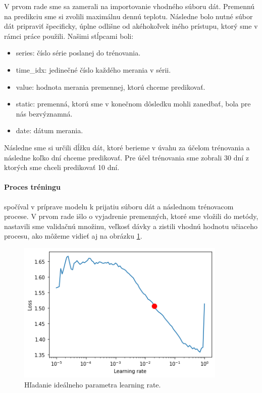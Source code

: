 V prvom rade sme sa zamerali na importovanie vhodného súboru dát. Premennú na predikciu sme si zvolili maximálnu dennú teplotu. Následne bolo nutné súbor dát pripraviť špecificky, úplne odlišne od akéhokoľvek iného prístupu, ktorý sme v rámci práce použili. Našimi stĺpcami boli:
\begin{itemize}
    \item series: číslo série poslanej do trénovania.
    \item time\_idx: jedinečné číslo každého merania v sérii.
    \item value: hodnota merania premennej, ktorú chceme predikovať.
    \item static: premenná, ktorú sme v konečnom dôsledku mohli zanedbať, bola pre nás bezvýznamná.
    \item date: dátum merania.
\end{itemize}

Následne sme si určili dĺžku dát, ktoré berieme v úvahu za účelom trénovania a následne koľko dní chceme predikovať. Pre účel trénovania sme zobrali 30 dní z ktorých sme chceli predikovať 10 dní.

\paragraph{Proces tréningu} spočíval v príprave modelu k prijatiu súboru dát a následnom trénovacom procese. V prvom rade išlo o vyjadrenie premenných, ktoré sme vložili do metódy, nastavili sme validačnú množinu, veľkosť dávky a zistili vhodnú hodnotu učiaceho procesu, ako môžeme vidieť aj na obrázku \ref{lr-tune}. 

\begin{figure}[!htbp]
  \centering
  \includegraphics[width=10cm]{img/n-beats-lr.png}
  \caption{Hľadanie ideálneho parametra learning rate.}
  \label{lr-tune}
\end{figure}

